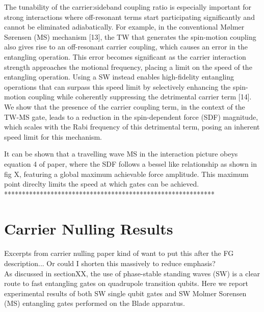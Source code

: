 \documentclass[12pt]{iopart}
\begin{document}
    The tunability of the carrier:sideband coupling ratio is especially
    important for strong interactions where off-resonant terms start
    participating significantly and cannot be eliminated
    adiabatically. For example, in the conventional Mølmer Sørensen (MS)
    mechanism [13], the TW that generates the spin-motion coupling also
    gives rise to an off-resonant carrier coupling, which causes an error
    in the entangling operation. This error becomes significant as the
    carrier interaction strength approaches the motional frequency,
    placing a limit on the speed of the entangling operation. Using a SW
    instead enables high-fidelity entangling operations that can surpass
    this speed limit by selectively enhancing the spin-motion coupling
    while coherently suppressing the detrimental carrier term [14].\\


    We show that the
    presence of the carrier coupling term, in the context of the TW-MS
    gate, leads to a reduction in the spin-dependent force (SDF)
    magnitude, which scales with the Rabi frequency of this detrimental
    term, posing an inherent speed limit for this mechanism.

    It can be shown that a travelling wave MS in the interaction picture obeys
    equation 4 of paper, where the SDF follows a bessel like
    relationship as shown in fig X, featuring a global maximum
    achievable force amplitude. This maximum point direclty limits the
    speed at which gates can be achieved.\\
    ***********************************************************\\

\section{Carrier Nulling Results}

    Excerpts from carrier nulling paper kind of want to put this after the FG description... Or could I shorten this massively to reduce emphasis?\\
    
    As discussed in sectionXX, the use of phase-stable standing waves (SW) is a clear route to fast entangling gates on quadrupole transition qubits. 
    Here we report experimental results of both SW single qubit gates and SW Molmer Sorensen (MS) entangling gates performed on the Blade apparatus.\\
\end{document}
